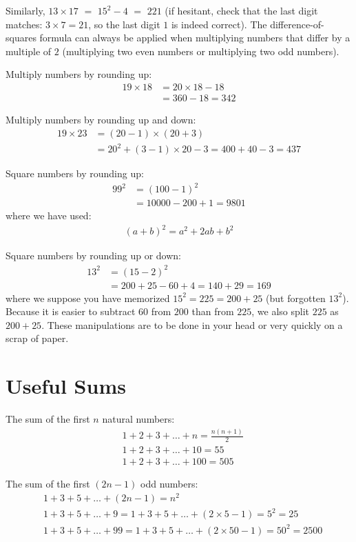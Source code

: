 \documentclass[12pt]{article}
\begin{document}
Similarly, $13 \times 17$ $=$ $15^2 -4$ $=$ $221$ (if hesitant, check that the last digit matches: $3\times7=21$, so the last digit $1$ is indeed correct).
The difference-of-squares formula can always be applied when multiplying numbers that differ by a multiple of $2$ (multiplying two even numbers or multiplying two odd numbers). 

Multiply numbers by rounding up:
\begin{align*}
19 \times 18
 & = 20 \times 18 - 18\\
 & = 360 - 18 = 342
\end{align*}

Multiply numbers by rounding up and down:
\begin{align*}
19 \times 23
 & = (20-1) \times (20+3) \\
 & = 20^2 + (3-1) \times 20 -3 = 400 + 40 - 3 = 437
\end{align*}

Square numbers by rounding up:
\begin{align*}
99^2 
 & = (100-1)^2 \\
 & = 10000 - 200 + 1 = 9801
\end{align*}
where we have used:
\begin{align*}
(a + b)^2 = a^2 + 2ab + b^2
\end{align*}

Square numbers by rounding up or down:
\begin{align*}
13^2 
 & = (15-2)^2 \\
 & = 200 + 25 - 60 + 4 = 140 + 29 = 169
\end{align*}
where we suppose you have memorized $15^2=225=200+25$ (but forgotten $13^2$). Because it is easier to subtract $60$ from $200$ than from $225$, we also split $225$ as $200+25$. These manipulations are to be done in your head or very quickly on a scrap of paper. 

\section*{Useful Sums}
The sum of the first $n$ natural numbers:
\begin{align*}
& 1+2+3+\ldots+n = \frac{n(n+1)}{2} \\
& 1+2+3+\ldots+10 = 55 \\
& 1+2+3+\ldots+100 = 505
\end{align*}

The sum of the first $(2n-1)$ odd numbers:
\begin{align*}
& 1+3+5+\ldots+(2n-1) = n^2 \\
& 1+3+5+\ldots+9 = 1+3+5+\ldots+(2\times5-1) = 5^2 = 25 \\
& 1+3+5+\ldots+99 = 1+3+5+\ldots+(2\times50-1) = 50^2 =  2500
\end{align*}
\end{document}
